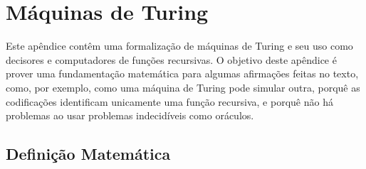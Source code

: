 \chapter{Máquinas de Turing}
\label{app:turing_machines}

\newcommand\B{\tikz{\draw (0, 0.5ex) -- (0, 0) -- (0.5em, 0) -- (0.5em, 0.5ex);}}

Este apêndice contêm uma formalização de máquinas de Turing
e seu uso como decisores e computadores de funções recursivas.
O objetivo deste apêndice é prover uma fundamentação matemática
para algumas afirmações feitas no texto,
como, por exemplo,
como uma máquina de Turing pode simular outra,
porquê as codificações identificam unicamente uma função recursiva,
e porquê não há problemas ao usar problemas indecidíveis como oráculos.

\section{Definição Matemática}

